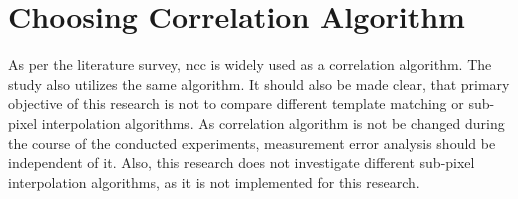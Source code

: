     \section{Choosing Correlation Algorithm}        
        As per the literature survey, \gls{ncc} is widely used as a correlation algorithm. The study also utilizes the same algorithm. It should also be made clear, that primary objective of this research is not to compare different template matching or sub-pixel interpolation algorithms. As correlation algorithm is not be changed during the course of the conducted experiments, measurement error analysis should be independent of it. Also, this research does not investigate different sub-pixel interpolation algorithms, as it is not implemented for this research.
    
    
     